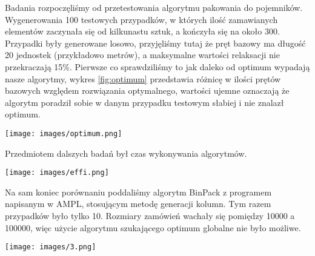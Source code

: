 Badania rozpoczęliśmy od przetestowania algorytmu pakowania do pojemników. Wygenerowania 100 testowych przypadków, w których ilość zamawianych elementów zaczynała się od kilkunastu sztuk, a kończyła się na około 300. Przypadki były generowane losowo, przyjęliśmy tutaj że pręt bazowy ma długość 20 jednostek (przykładowo metrów), a maksymalne wartości relaksacji nie przekraczają 15\%. Pierwsze co sprawdziliśmy to jak daleko od optimum wypadają nasze algorytmy, wykres \ref{fig:optimum} przedstawia różnicę w ilości prętów bazowych względem rozwiązania optymalnego, wartości ujemne oznaczają że algorytm poradził sobie w danym przypadku testowym słabiej i nie znalazł optimum.

\begin{figure*}[!h]
    \begin{center}
        \texttt{[image: images/optimum.png]}
    \end{center}
    \caption{Jakość szukania optimum}
    \label{fig:optimum}
\end{figure*}

\FloatBarrier %

Przedmiotem dalszych badań był czas wykonywania algorytmów.

\begin{figure*}
    \begin{center}
        \texttt{[image: images/effi.png]}
    \end{center}
    \caption{Czas wykonywania algorytmu BinPack}
    \label{fig:effi}
\end{figure*}

\FloatBarrier %

Na sam koniec porównaniu poddaliśmy algorytm BinPack z programem napisanym w AMPL, stosującym metodę generacji kolumn. Tym razem przypadków było tylko 10. Rozmiary zamówień wachały się pomiędzy 10000 a 100000, więc użycie algorytmu szukającego optimum globalne nie było możliwe.

\begin{figure*}
    \begin{center}
        \texttt{[image: images/3.png]}
    \end{center}
    \caption{Znalezione rozwiązania}
    \label{fig:optimum2}
\end{figure*}

\FloatBarrier %

